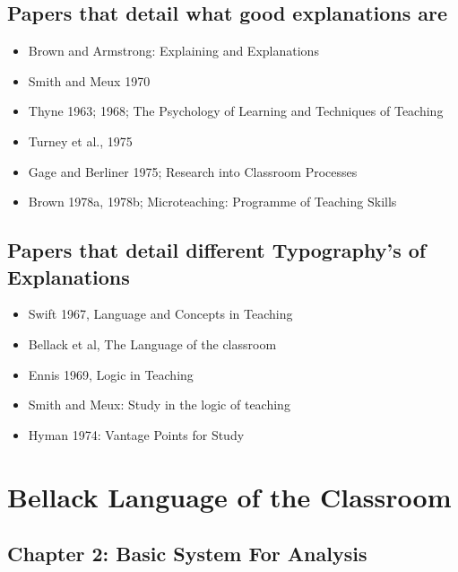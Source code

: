 \documentclass[10pt, letterpaper]{article}
\begin{document}
\subsection*{Papers that detail what good explanations are}
\label{sec:org8917b23}
\begin{itemize}
\item Brown and Armstrong: Explaining and Explanations \cite{brown1984explaining}
\item Smith and Meux 1970
\item Thyne 1963; 1968; The Psychology of Learning and Techniques of Teaching \cite{thyne1965psychology}
\item Turney et al., 1975
\item Gage and Berliner 1975; Research into Classroom Processes
\item Brown 1978a, 1978b; Microteaching: Programme of Teaching Skills \cite{10.2307/3120386}
\end{itemize}

\subsection*{Papers that detail different Typography's of Explanations}
\label{sec:orgf9650f6}
\begin{itemize}
\item Swift 1967, Language and Concepts in Teaching \cite{smith1967language}
\item Bellack et al, The Language of the classroom \cite{bellack1966language}
\item Ennis 1969, Logic in Teaching \cite{ennis1969logic}
\item Smith and Meux: Study in the logic of teaching \cite{Smith1970-SMIASO-13}
\item Hyman 1974: Vantage Points for Study \cite{hyman1968teaching}
\end{itemize}


\section*{Bellack Language of the Classroom}
\label{sec:orgf50d7a0}

\subsection*{Chapter 2: Basic System For Analysis}
\label{sec:orga8ab073}
\end{document}
